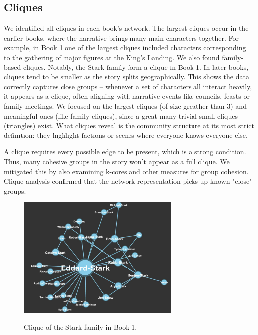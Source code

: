 \documentclass[12pt, a4paper]{article}
\begin{document}
	\subsection*{Cliques}
	We identified all cliques in each book's network. The largest cliques
       occur in the earlier books, where the narrative brings many main 
       characters together. For example, in Book 1 one of the largest 
       cliques included characters corresponding to the gathering of 
       major figures at the King's Landing. We also found family-based
        cliques. Notably, the Stark family form a clique in Book 1. 
        In later books, cliques tend to be smaller as the story splits 
        geographically. This shows the data correctly captures close 
        groups – whenever a set of characters all interact heavily, 
        it appears as a clique, often aligning with narrative events 
        like councils, feasts or family meetings. 
	We focused on the largest cliques (of size greather than 3) 
      and meaningful ones (like family cliques), since a great many 
      trivial small cliques (triangles) exist. What cliques reveal 
      is the community structure at its most strict definition: they 
      highlight factions or scenes where everyone knows everyone else. 
	
	A clique requires every possible edge to be present, 
      which is a strong condition. 
      Thus, many cohesive groups in the story won't appear as a full clique. 
      We mitigated this by also examining k-cores and other measures for 
      group cohesion. Clique analysis confirmed that the network 
      representation picks up known "close" groups.
	
	\begin{figure}[htbp]
		\centering
		\includegraphics[width=0.7\textwidth]{clique_stark.jpeg}
		\label{fig:cliquestark}
            \caption{Clique of the Stark family in Book 1.}
	\end{figure}
	\FloatBarrier
	
\end{document}
